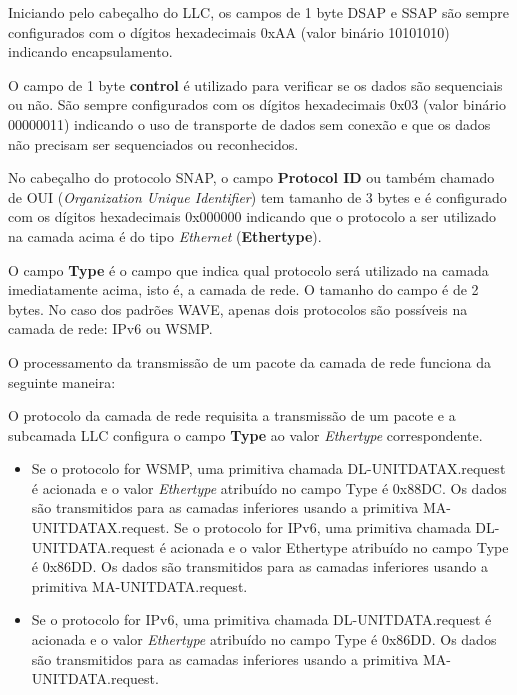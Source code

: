 \documentclass[
12pt,				%
openright,			%
oneside,			%
a4paper,			%
brazil,				%
]{abntex2}
\begin{document}
	\par Iniciando pelo cabeçalho do LLC, os campos de 1 byte DSAP e SSAP são sempre configurados com o dígitos hexadecimais 0xAA (valor binário 10101010) indicando encapsulamento.
	
	\par O campo de 1 byte \textbf{control} é utilizado para verificar se os dados são sequenciais ou não. São sempre configurados com os dígitos hexadecimais 0x03 (valor binário 00000011) indicando o uso de transporte de dados sem conexão e que os dados não precisam ser sequenciados ou reconhecidos.
	
	\par No cabeçalho do protocolo SNAP, o campo \textbf{Protocol ID} ou também chamado de OUI (\textit{Organization Unique Identifier}) tem tamanho de 3 bytes e é configurado com os dígitos hexadecimais 0x000000 indicando que o protocolo a ser utilizado na camada acima é do tipo \textit{Ethernet} (\textbf{Ethertype}).
	
	\par O campo \textbf{Type} é o campo que indica qual protocolo será utilizado na camada imediatamente acima, isto é, a camada de rede. O tamanho do campo é de 2 bytes. No caso dos padrões WAVE, apenas dois protocolos são possíveis na camada de rede: IPv6 ou WSMP. 
	
	\par O processamento da transmissão de um pacote da camada de rede funciona da seguinte maneira: 
	
	\par O protocolo da camada de rede requisita a transmissão de um pacote e a subcamada LLC configura o campo \textbf{Type} ao valor \textit{Ethertype} correspondente. 
	
	\begin{itemize} %
	    \item Se o protocolo for WSMP, uma primitiva chamada DL-UNITDATAX.request é acionada e o valor \textit{Ethertype} atribuído no campo Type é 0x88DC. Os dados são transmitidos para as camadas inferiores usando a primitiva MA-UNITDATAX.request. Se o protocolo for IPv6, uma primitiva chamada DL-UNITDATA.request é acionada e o valor Ethertype atribuído no campo Type é 0x86DD. Os dados são transmitidos para as camadas inferiores usando a primitiva MA-UNITDATA.request.
        \item Se o protocolo for IPv6, uma primitiva chamada DL-UNITDATA.request é acionada e o valor \textit{Ethertype} atribuído no campo Type é 0x86DD. Os dados são transmitidos para as camadas inferiores usando a primitiva MA-UNITDATA.request.
    \end{itemize}
	
\end{document}
